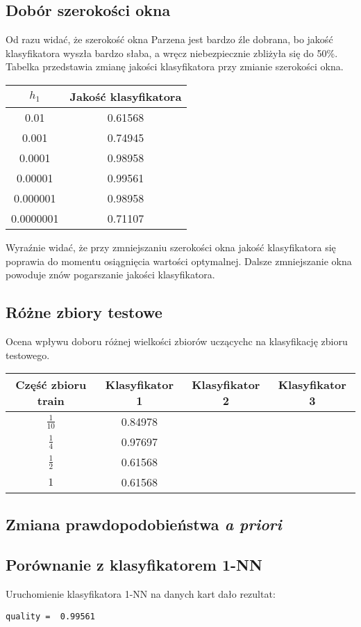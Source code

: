 \documentclass[12pt,a4paper,notitlepage]{article}
\begin{document}
\subsection*{Dobór szerokości okna}
Od razu widać, że szerokość okna Parzena jest bardzo źle dobrana, bo jakość klasyfikatora wyszła bardzo słaba, a wręcz niebezpiecznie zbliżyła się do 50\%. Tabelka przedstawia zmianę jakości klasyfikatora przy zmianie szerokości okna. 
\begin{center}
\begin{tabular}{|c|c|}
\hline
	$h_1$	&	Jakość klasyfikatora \\\hline
	0.01		&		0.61568		\\\hline
	0.001		&		0.74945		\\\hline
	0.0001		&		0.98958		\\\hline
	0.00001 	&		0.99561		\\\hline
	0.000001	&		0.98958		\\\hline
	0.0000001	&		0.71107		\\\hline	
\end{tabular}
\end{center}
Wyraźnie widać, że przy zmniejszaniu szerokości okna jakość klasyfikatora się poprawia do momentu osiągnięcia wartości optymalnej. Dalsze zmniejszanie okna powoduje znów pogarszanie jakości klasyfikatora. 

\subsection*{Różne zbiory testowe}
Ocena wpływu doboru różnej wielkości zbiorów uczącychc na klasyfikację zbioru testowego. 
\begin{center}
\begin{tabular}{|c|c|c|c|}
\hline
Część zbioru train	&	Klasyfikator 1 	&	Klasyfikator 2 	&	Klasyfikator 3 \\\hline
	$\frac{1}{10}$	&		0.84978		&					&					\\\hline
	$\frac{1}{4}$	&		0.97697		&					&					\\\hline
	$\frac{1}{2}$	&		0.61568		&					&					\\\hline
	$1$				&		0.61568		&					&					\\\hline
\end{tabular}
\end{center}

\subsection*{Zmiana prawdopodobieństwa \textit{a priori}}



\subsection*{Porównanie z klasyfikatorem 1-NN}
Uruchomienie klasyfikatora 1-NN na danych kart dało rezultat:
\begin{verbatim}
quality =  0.99561
\end{verbatim}
\end{document}
